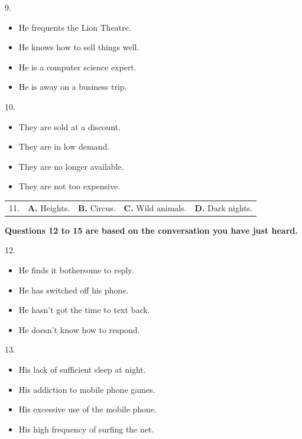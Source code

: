 \documentclass[UTF8,11pt]{ctexart}
\begin{document}
9.


\begin{itemize}[leftmargin=2em,itemsep=.2em,topsep=.4em]\item[A.] He frequents the Lion Theatre.
\item[B.] He knows how to sell things well.
\item[C.] He is a computer science expert.
\item[D.] He is away on a business trip.
\end{itemize}

10.


\begin{itemize}[leftmargin=2em,itemsep=.2em,topsep=.4em]\item[A.] They are sold at a discount.
\item[B.] They are in low demand.
\item[C.] They are no longer available.
\item[D.] They are not too expensive.
\end{itemize}

\noindent\begin{tabularx}{\linewidth}{@{}lXXXX@{}}11. & \textbf{A.} Heights. & \textbf{B.} Circus. & \textbf{C.} Wild animals. & \textbf{D.} Dark nights.\\\end{tabularx}\par

\textbf{Questions 12 to 15 are based on the conversation you have just heard.}


12.


\begin{itemize}[leftmargin=2em,itemsep=.2em,topsep=.4em]\item[A.] He finds it bothersome to reply.
\item[B.] He has switched off his phone.
\item[C.] He hasn’t got the time to text back.
\item[D.] He doesn’t know how to respond.
\end{itemize}

13.


\begin{itemize}[leftmargin=2em,itemsep=.2em,topsep=.4em]\item[A.] His lack of sufficient sleep at night.
\item[B.] His addiction to mobile phone games.
\item[C.] His excessive use of the mobile phone.
\item[D.] His high frequency of surfing the net.
\end{itemize}
\end{document}
